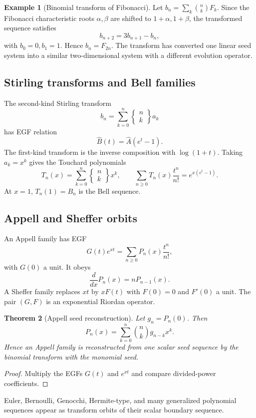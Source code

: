 \documentclass[11pt]{article}
\newtheorem{theorem}{Theorem}[section]\newtheorem{proposition}[theorem]{Proposition}\newtheorem{lemma}[theorem]{Lemma}\newtheorem{corollary}[theorem]{Corollary}
\theoremstyle{definition}\newtheorem{definition}[theorem]{Definition}\newtheorem{example}[theorem]{Example}\newtheorem{construction}[theorem]{Construction}\newtheorem{algorithm}[theorem]{Algorithm}\newtheorem{conjecture}[theorem]{Conjecture}\newtheorem{problem}[theorem]{Problem}
\theoremstyle{remark}\newtheorem{remark}[theorem]{Remark}\newtheorem{boundary}[theorem]{Boundary}\newtheorem{certificate}[theorem]{Computational Certificate}\newtheorem{classical}[theorem]{Classical Input}\newtheorem{principle}[theorem]{Structural Principle}
\begin{document}
\begin{example}[Binomial transform of Fibonacci]
Let $b_n=\sum_k\binom nkF_k$.  Since the Fibonacci characteristic roots $\alpha,\beta$ are shifted to $1+\alpha,1+\beta$, the transformed sequence satisfies
\[
 b_{n+2}=3b_{n+1}-b_n,
\]
with $b_0=0,b_1=1$.  Hence $b_n=F_{2n}$.  The transform has converted one linear seed system into a similar two-dimensional system with a different evolution operator.
\end{example}

\subsection{Stirling transforms and Bell families}
The second-kind Stirling transform
\[
 b_n=\sum_{k=0}^{n}\left\{\begin{matrix}n\\k\end{matrix}\right\}a_k
\]
has EGF relation
\[
 \widehat B(t)=\widehat A(e^t-1).
\]
The first-kind transform is the inverse composition with $\log(1+t)$.  Taking $a_k=x^k$ gives the Touchard polynomials
\[
 T_n(x)=\sum_{k=0}^{n}\left\{\begin{matrix}n\\k\end{matrix}\right\}x^k,
\qquad
 \sum_{n\geq0}T_n(x)\frac{t^n}{n!}=e^{x(e^t-1)}.
\]
At $x=1$, $T_n(1)=B_n$ is the Bell sequence.

\subsection{Appell and Sheffer orbits}
An Appell family has EGF
\[
 G(t)e^{xt}=\sum_{n\geq0}P_n(x)\frac{t^n}{n!},
\]
with $G(0)$ a unit.  It obeys
\[
 \frac{d}{dx}P_n(x)=nP_{n-1}(x).
\]
A Sheffer family replaces $xt$ by $xF(t)$ with $F(0)=0$ and $F'(0)$ a unit.  The pair $(G,F)$ is an exponential Riordan operator.

\begin{theorem}[Appell seed reconstruction]
Let $g_n=P_n(0)$.  Then
\[
 \boxed{P_n(x)=\sum_{k=0}^{n}\binom nk g_{n-k}x^k.}
\]
Hence an Appell family is reconstructed from one scalar seed sequence by the binomial transform with the monomial seed.
\end{theorem}
\begin{proof}
Multiply the EGFs $G(t)$ and $e^{xt}$ and compare divided-power coefficients.
\end{proof}

Euler, Bernoulli, Genocchi, Hermite-type, and many generalized polynomial sequences appear as transform orbits of their scalar boundary sequence.
\end{document}
